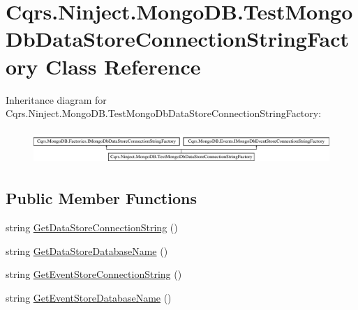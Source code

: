 \hypertarget{classCqrs_1_1Ninject_1_1MongoDB_1_1TestMongoDbDataStoreConnectionStringFactory}{}\section{Cqrs.\+Ninject.\+Mongo\+D\+B.\+Test\+Mongo\+Db\+Data\+Store\+Connection\+String\+Factory Class Reference}
\label{classCqrs_1_1Ninject_1_1MongoDB_1_1TestMongoDbDataStoreConnectionStringFactory}
Inheritance diagram for Cqrs.\+Ninject.\+Mongo\+D\+B.\+Test\+Mongo\+Db\+Data\+Store\+Connection\+String\+Factory\+:\begin{figure}[H]
\begin{center}
\leavevmode
\includegraphics[height=1.308411cm]{classCqrs_1_1Ninject_1_1MongoDB_1_1TestMongoDbDataStoreConnectionStringFactory}
\end{center}
\end{figure}
\subsection*{Public Member Functions}
\begin{DoxyCompactItemize}
\item 
string \hyperlink{classCqrs_1_1Ninject_1_1MongoDB_1_1TestMongoDbDataStoreConnectionStringFactory_abc9f81219c65af4182635cd545282b65_abc9f81219c65af4182635cd545282b65}{Get\+Data\+Store\+Connection\+String} ()
\item 
string \hyperlink{classCqrs_1_1Ninject_1_1MongoDB_1_1TestMongoDbDataStoreConnectionStringFactory_a9ef0515d08d9a309fcfef00b15dad8cf_a9ef0515d08d9a309fcfef00b15dad8cf}{Get\+Data\+Store\+Database\+Name} ()
\item 
string \hyperlink{classCqrs_1_1Ninject_1_1MongoDB_1_1TestMongoDbDataStoreConnectionStringFactory_a3dcdc2262f3a39be8fdba16a6d09c523_a3dcdc2262f3a39be8fdba16a6d09c523}{Get\+Event\+Store\+Connection\+String} ()
\item 
string \hyperlink{classCqrs_1_1Ninject_1_1MongoDB_1_1TestMongoDbDataStoreConnectionStringFactory_ae34e14a01ee79e427a87b6ef2c220288_ae34e14a01ee79e427a87b6ef2c220288}{Get\+Event\+Store\+Database\+Name} ()
\end{DoxyCompactItemize}
